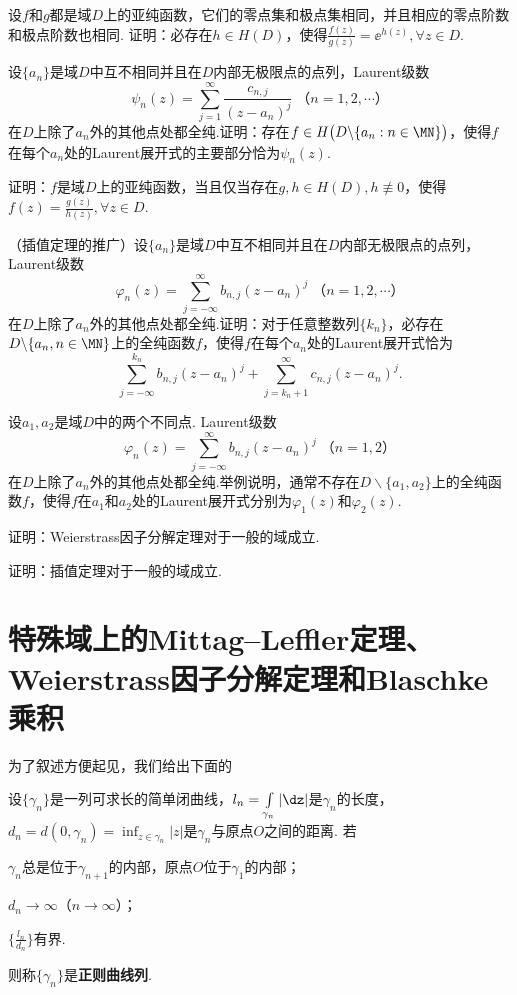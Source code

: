 \begin{xiti}
\item 设$f$和$g$都是域$D$上的亚纯函数，它们的零点集和极点集相同，并且相应的零点阶数和极点阶数也相同. 证明：必存在$h\in H(D)$，使得$\frac{f(z)}{g(z)}=\ee^{h(z)},\forall z\in D$.
\item 设$\{a_n\}$是域$D$中互不相同并且在$D$内部无极限点的点列，Laurent级数
\[\psi_n(z)=\sum_{j=1}^\infty\frac{c_{n,j}}{(z-a_n)^j}\;\mbox{（$n=1,2,\cdots$）}\]
在$D$上除了$a_n$外的其他点处都全纯.证明：存在$f\in H\big(D\backslash
\{a_n:n\in\MN\}\big)$，使得$f$在每个$a_n$处的Laurent展开式的主要部分恰为$\psi_n(z)$.
\item 证明：$f$是域$D$上的亚纯函数，当且仅当存在$g,h\in H(D),h\not\equiv0$，使得$f(z)=\frac{g(z)}{h(z)},\forall z\in D$.
\item （插值定理的推广）设$\{a_n\}$是域$D$中互不相同并且在$D$内部无极限点的点列，Laurent级数
\[\varphi_n(z)=\sum_{j=-\infty}^\infty b_{n,j}(z-a_n)^j\;\mbox{（$n=1,2,\cdots$）}\]
在$D$上除了$a_n$外的其他点处都全纯.证明：对于任意整数列$\{k_n\}$，必存在$D\backslash
\{a_n,n\in\MN\}$上的全纯函数$f$，使得$f$在每个$a_n$处的Laurent展开式恰为
\[\sum_{j=-\infty}^{k_n}b_{n,j}(z-a_n)^j+\sum_{j=k_n+1}^\infty c_{n,j}(z-a_n)^j.\]
\item 设$a_1,a_2$是域$D$中的两个不同点. Laurent级数
\[\varphi_n(z)=\sum_{j=-\infty}^\infty b_{n,j}(z-a_n)^j\;\mbox{（$n=1,2$）}\]
在$D$上除了$a_n$外的其他点处都全纯.举例说明，通常不存在$D\backslash\{a_1,a_2\}$上的全纯函数$f$，使得$f$在$a_1$和$a_2$处的Laurent展开式分别为$\varphi_1(z)$和$\varphi_2(z)$.
\item 证明：Weierstrass因子分解定理对于一般的域成立.
\item 证明：插值定理对于一般的域成立.
\end{xiti}

\section{特殊域上的Mittag--Leffler定理、
Weierstrass因子分解定理和Blaschke 乘积\label{sec5.7}}
为了叙述方便起见，我们给出下面的
\begin{definition}\label{def5.7.1}
设$\{\gamma_n\}$是一列可求长的简单闭曲线，$l_n=\int\limits_{\gamma_n}|\dz|$是$\gamma_n$的长度，$d_n=d(0,\gamma_n)=\inf_{z\in\gamma_n}|z|$是$\gamma_n$与原点$O$之间的距离. 若
\begin{eenum}
  \item $\gamma_n$总是位于$\gamma_{n+1}$的内部，原点$O$位于$\gamma_1$的内部；
  \item $d_n\to\infty$（$n\to\infty$）；
  \item $\bigg\{\frac{l_n}{d_n}\bigg\}$有界.
\end{eenum}
则称$\{\gamma_n\}$是\textbf{正则曲线列}.
\end{definition}

